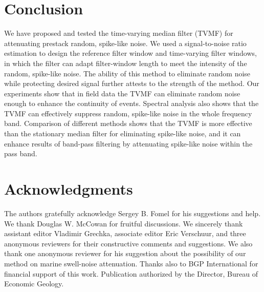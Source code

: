 
 \section{Conclusion}

We have proposed and tested the time-varying median filter 
(TVMF) for attenuating 
prestack random, spike-like noise. We used a signal-to-noise ratio estimation to design 
the reference filter window and time-varying filter windows, in which the filter 
can adapt filter-window length to meet the intensity of the random, spike-like noise.
The ability of this method to eliminate random noise while protecting desired signal 
further attests to the strength of the method.
Our experiments show that in field data the TVMF can eliminate random noise enough to
enhance the continuity of events. Spectral analysis also shows that the TVMF 
can effectively suppress random, spike-like noise in the whole frequency band. Comparison 
of different methods shows that the TVMF is more effective than the stationary 
median filter for eliminating 
spike-like noise, and it can enhance results of band-pass filtering by attenuating 
spike-like noise within the pass band.

\section{Acknowledgments}

The authors gratefully acknowledge Sergey B. Fomel for his suggestions and help. We 
thank Douglas W. McCowan for fruitful discussions. We sincerely thank assistant 
editor Vladimir Grechka, associate editor Eric Verschuur, and three anonymous 
reviewers for their constructive comments and suggestions. We also thank one 
anonymous reviewer for his suggestion about the possibility of our method on marine 
swell-noise attenuation. Thanks also to BGP International for financial support of this work. 
Publication authorized by the Director, Bureau of Economic Geology.




